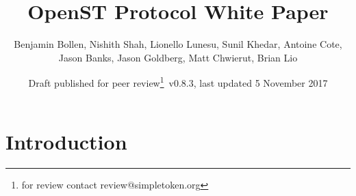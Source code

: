 \documentclass[12pt,a4paper, twocolumn]{article}
\title{{\sc OpenST Protocol White Paper}}
\author{Benjamin Bollen, Nishith Shah, Lionello Lunesu, Sunil Khedar, Antoine Cote,\\ Jason Banks, Jason Goldberg, Matt Chwierut, Brian Lio}
\date{Draft published for peer review\footnote{for review contact review@simpletoken.org}\, v0.8.3, last updated 5 November 2017}
\begin{document}
\maketitle

\section{Introduction}
\end{document}
